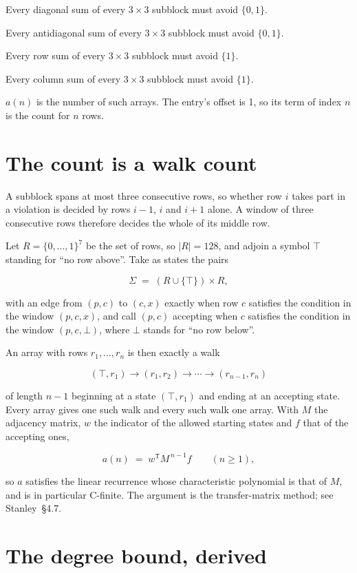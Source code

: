\documentclass[11pt]{article}
\theoremstyle{definition}
\begin{document}
Every diagonal sum of every $3\times3$ subblock must avoid $\{0, 1\}$.

Every antidiagonal sum of every $3\times3$ subblock must avoid $\{0, 1\}$.

Every row sum of every $3\times3$ subblock must avoid $\{1\}$.

Every column sum of every $3\times3$ subblock must avoid $\{1\}$.

$a(n)$ is the number of such arrays. The entry's offset is 1, so its term of index $n$ is the count for $n$ rows.

\section{The count is a walk count}

A subblock spans at most three consecutive rows, so whether row $i$ takes part in a violation is decided by rows $i-1$, $i$ and $i+1$ alone. A window of three consecutive rows therefore decides the whole of its middle row.

Let $R = \{0,\dots,1\}^{7}$ be the set of rows, so $|R| = 128$, and adjoin a symbol $\top$ standing for ``no row above''. Take as states the pairs

\[\Sigma \;=\; (R \cup \{\top\}) \times R,\]

with an edge from $(p,c)$ to $(c,x)$ exactly when row $c$ satisfies the condition in the window $(p,c,x)$, and call $(p,c)$ accepting when $c$ satisfies the condition in the window $(p,c,\bot)$, where $\bot$ stands for ``no row below''.

An array with rows $r_1,\dots,r_n$ is then exactly a walk

\[(\top,r_1) \to (r_1,r_2) \to \cdots \to (r_{n-1},r_n)\]

of length $n-1$ beginning at a state $(\top,r_1)$ and ending at an accepting state. Every array gives one such walk and every such walk one array. With $M$ the adjacency matrix, $w$ the indicator of the allowed starting states and $f$ that of the accepting ones,

\[a(n) \;=\; w^{\mathsf T} M^{\,n-1} f \qquad (n \ge 1),\]

so $a$ satisfies the linear recurrence whose characteristic polynomial is that of $M$, and is in particular C-finite. The argument is the transfer-matrix method; see Stanley~\S4.7.

\section{The degree bound, derived}
\end{document}
